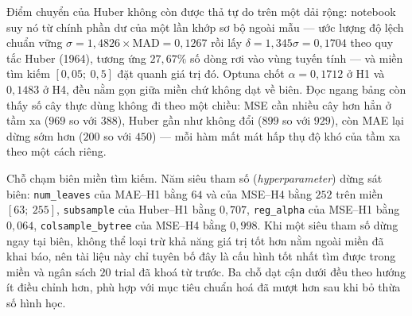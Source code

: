\documentclass[12pt, a4paper]{report}
\begin{document}
\begin{table}[htbp]
\centering
\caption{Bộ siêu tham số Optuna chọn được trong miền tìm kiếm, theo từng cấu hình}
\label{tab:sieu_tham_so}
\scriptsize
{}


\end{table}

Điểm chuyển của Huber không còn được thả tự do trên một dải rộng: notebook suy nó từ chính
phần dư của một lần khớp sơ bộ ngoài mẫu --- ước lượng độ lệch chuẩn vững
$\sigma = 1{,}4826 \times \mathrm{MAD} = 0{,}1267$ rồi lấy $\delta = 1{,}345\sigma = 0{,}1704$
theo quy tắc Huber (1964), tương ứng $27{,}67\%$ số dòng rơi vào vùng tuyến tính --- và miền
tìm kiếm $[0{,}05;\ 0{,}5]$ đặt quanh giá trị đó. Optuna chốt $\alpha = 0{,}1712$ ở H1 và
$0{,}1483$ ở H4, đều nằm gọn giữa miền chứ không dạt về biên. Đọc ngang bảng còn thấy số cây
thực dùng không đi theo một chiều: MSE cần nhiều cây hơn hẳn ở tầm xa ($969$ so với $388$),
Huber gần như không đổi ($899$ so với $929$), còn MAE lại dừng sớm hơn ($200$ so với $450$) ---
mỗi hàm mất mát hấp thụ độ khó của tầm xa theo một cách riêng.

Chỗ chạm biên miền tìm kiếm. Năm siêu tham số (\textit{hyperparameter}) dừng sát
biên: \texttt{num\_leaves} của MAE--H1 bằng $64$ và của MSE--H4 bằng $252$ trên miền
$[63;\ 255]$, \texttt{subsample} của Huber--H1 bằng $0{,}707$, \texttt{reg\_alpha} của MSE--H1
bằng $0{,}064$, \texttt{colsample\_bytree} của MSE--H4 bằng $0{,}998$. Khi một siêu tham số
dừng ngay tại biên, không thể loại trừ khả năng giá trị tốt hơn nằm ngoài miền đã khai báo,
nên tài liệu này chỉ tuyên bố đây là cấu hình tốt nhất tìm được trong miền và ngân sách $20$
trial đã khoá từ trước. Ba chỗ dạt cận dưới đều theo hướng ít điều chỉnh hơn, phù hợp với mục
tiêu chuẩn hoá đã mượt hơn sau khi bỏ thừa số hình học.
\end{document}
